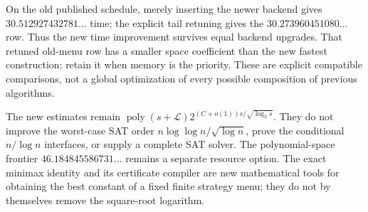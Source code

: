 On the old published schedule, merely inserting the newer backend gives
$30.512927432781\ldots$ time; the explicit tail retuning gives the
$30.273960451080\ldots$ row. Thus the new time improvement survives equal
backend upgrades. That retuned old-menu row has a smaller space coefficient
than the new fastest construction; retain it when memory is the priority.
These are explicit compatible comparisons, not a global optimization of
every possible composition of previous algorithms.

The new estimates remain
$\operatorname{poly}(s+\mathcal L)2^{(C+o(1))s/\sqrt{\log_2s}}$.
They do not improve the worst-case SAT order
$n\log\log n/\sqrt{\log n}$, prove the conditional $n/\log n$ interfaces,
or supply a complete SAT solver. The polynomial-space frontier
$46.184845586731\ldots$ remains a separate resource option. The exact
minimax identity and its certificate compiler are new mathematical tools
for obtaining the best constant of a fixed finite strategy menu; they do
not by themselves remove the square-root logarithm.
